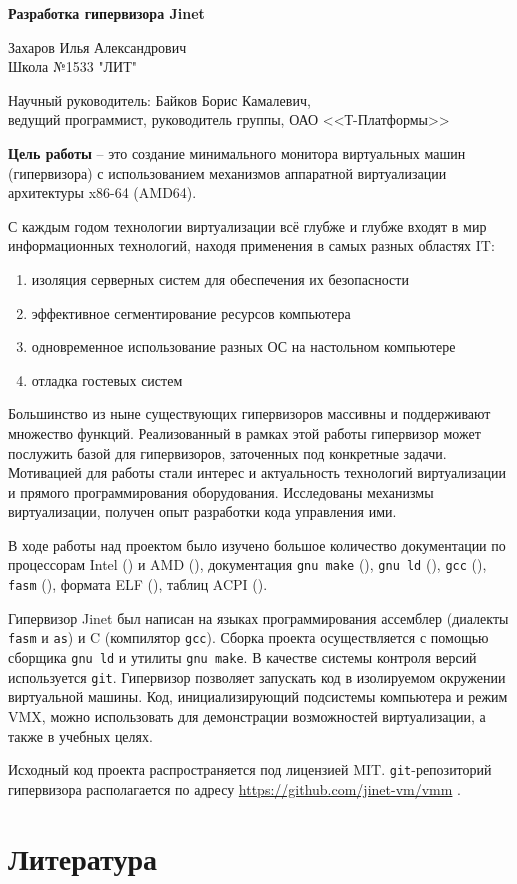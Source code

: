 \documentclass[a4paper,12pt]{extarticle}
\begin{document}
	
	{\Large \textbf{Разработка гипервизора Jinet}}\par
	Захаров Илья Александрович\\
	Школа №1533 "ЛИТ"\par
	Научный руководитель: Байков Борис Камалевич,\\ ведущий программист, руководитель группы, ОАО <<Т-Платформы>>
	\\\par

\setlength{\parskip}{0.5em}
	\textbf{Цель работы} -- это создание минимального монитора виртуальных машин (гипервизора) с использованием механизмов аппаратной виртуализации архитектуры x86-64 (AMD64). \\\par
	С каждым годом технологии виртуализации всё глубже и глубже входят в мир информационных технологий, находя применения в самых разных областях IT:
	\begin{enumerate}
		\item изоляция серверных систем для обеспечения их безопасности
		\item эффективное сегментирование ресурсов компьютера
		\item одновременное использование разных ОС на настольном компьютере
		\item отладка гостевых систем 
	\end{enumerate}
	\par Большинство из ныне существующих гипервизоров массивны и поддерживают множество функций. Реализованный в рамках этой работы гипервизор может послужить базой для гипервизоров, заточенных под конкретные задачи. Мотивацией для работы стали интерес и актуальность технологий виртуализации и прямого программирования оборудования. Исследованы механизмы виртуализации, получен опыт разработки кода управления ими. \par
	В ходе работы над проектом было изучено большое количество документации по процессорам Intel (\cite{intel}) и AMD (\cite{amd}), документация \texttt{gnu make} (\cite{make}), \texttt{gnu ld} (\cite{ld}), \texttt{gcc} (\cite{gcc}), \texttt{fasm} (\cite{fasm}), формата ELF (\cite{elf}), таблиц ACPI (\cite{acpi}).\par
	Гипервизор Jinet был написан на языках программирования ассемблер (диалекты \texttt{fasm} и \texttt{as}) и C (компилятор \texttt{gcc}). Сборка проекта осуществляется с помощью сборщика \texttt{gnu ld} и утилиты \texttt{gnu make}. В качестве системы контроля версий используется \texttt{git}. Гипервизор позволяет запускать код в изолируемом окружении виртуальной машины. Код, инициализирующий подсистемы компьютера и режим VMX, можно использовать для демонстрации возможностей виртуализации, а также в учебных целях.\par
	Исходный код проекта распространяется под лицензией MIT. \texttt{git}-репозиторий гипервизора располагается по адресу \url{https://github.com/jinet-vm/vmm} .
	\section{Литература}
	\nocite{*}
	\renewcommand{\section}[2]{}%
	
	
\end{document}
